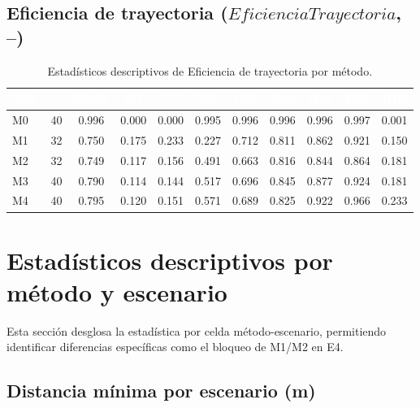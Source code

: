 \documentclass[12pt,a4paper,oneside]{book}
\begin{document}
\subsection{Eficiencia de trayectoria ($\textit{EficienciaTrayectoria}$, --)}

\begin{table}[H]
\centering
\caption{Estadísticos descriptivos de Eficiencia de trayectoria por método.}
\renewcommand{\arraystretch}{1.25}
\small
\begin{tabular}{lcccccccccc}
\toprule
\rowcolor{primary}
\textcolor{white}{\textbf{Mét.}} & \textcolor{white}{\textbf{n}} & \textcolor{white}{\textbf{Media}} & \textcolor{white}{\textbf{SD}} & \textcolor{white}{\textbf{CV}} & \textcolor{white}{\textbf{Mín}} & \textcolor{white}{\textbf{Q25}} & \textcolor{white}{\textbf{Med}} & \textcolor{white}{\textbf{Q75}} & \textcolor{white}{\textbf{Máx}} & \textcolor{white}{\textbf{IQR}} \\
\midrule
M0 & 40 & 0.996 & 0.000 & 0.000 & 0.995 & 0.996 & 0.996 & 0.996 & 0.997 & 0.001 \\
M1 & 32 & 0.750 & 0.175 & 0.233 & 0.227 & 0.712 & 0.811 & 0.862 & 0.921 & 0.150 \\
M2 & 32 & 0.749 & 0.117 & 0.156 & 0.491 & 0.663 & 0.816 & 0.844 & 0.864 & 0.181 \\
M3 & 40 & 0.790 & 0.114 & 0.144 & 0.517 & 0.696 & 0.845 & 0.877 & 0.924 & 0.181 \\
M4 & 40 & 0.795 & 0.120 & 0.151 & 0.571 & 0.689 & 0.825 & 0.922 & 0.966 & 0.233 \\
\bottomrule
\end{tabular}
\end{table}

\newpage
\section{Estadísticos descriptivos por método y escenario}

Esta sección desglosa la estadística por celda método-escenario, permitiendo identificar diferencias específicas como el bloqueo de M1/M2 en E4.

\subsection{Distancia mínima por escenario (m)}
\end{document}
